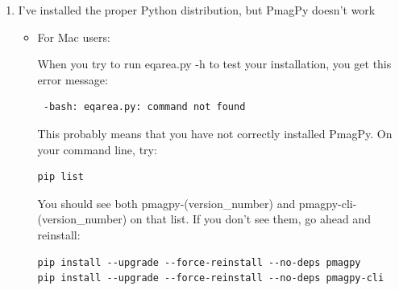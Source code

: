 \documentclass[11pt]{book}
\begin{document}
{{{{{{\begin{enumerate}
\begin{itemize}
or

\begin{verbatim}$ python
Python 3.6.0 |Anaconda 4.3.1 (x86_64)| (default, Dec 23 2016, 13:19:00)
[GCC 4.2.1 Compatible Apple LLVM 6.0 (clang-600.0.57)] on darwin
Type "help", "copyright", "credits" or "license" for more information.
\end{verbatim}

\item If you don't see one of the above messages, you have not fully installed the Python distribution.  You'll need to try again.  In order to fully install Canopy Python (it will be your Applications folder) and select ``yes'' to use Canopy Python as your default Python.

\end{itemize}


\item I've installed the proper Python distribution, but PmagPy doesn't work

\begin{itemize}

\item For Mac users:


When you try to run eqarea.py -h to test your installation, you get this error message:

\begin{verbatim} -bash: eqarea.py: command not found
\end{verbatim}

This probably means that you have not correctly installed PmagPy.  On your command line, try:

\begin{verbatim}
pip list
\end{verbatim}

You should see both pmagpy-(version_number) and pmagpy-cli-(version_number) on that list.  If you don't see them, go ahead and reinstall:

\begin{verbatim}
pip install --upgrade --force-reinstall --no-deps pmagpy
pip install --upgrade --force-reinstall --no-deps pmagpy-cli
\end{verbatim}





\end{itemize}
\end{enumerate}}}}}}}
\end{document}
